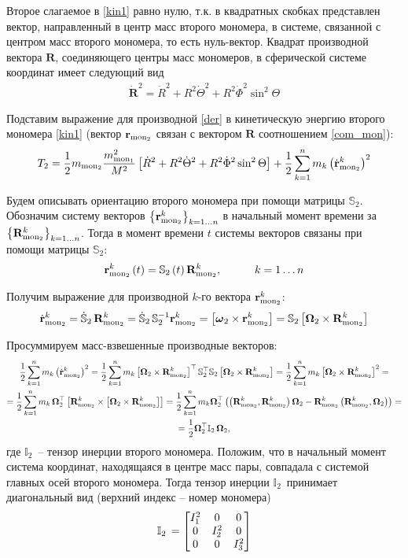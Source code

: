 \documentclass[14pt]{extarticle}
\newcommand{\vR}{\mathbf{R}}
\newcommand{\dvR}{\dot{\mathbf{R}}}
\newcommand{\mmf}{m_{\textup{mon}_1}}
\newcommand{\mms}{m_{\textup{mon}_2}}
\newcommand{\vrms}{\mathbf{r}_{\textup{mon}_2}}
\newcommand{\vRms}{\mathbf{R}_{\textup{mon}_2}}
\newcommand{\dvrms}{\dot{\mathbf{r}}_{\textup{mon}_2}}
\newcommand{\dR}{\dot{R}}
\newcommand{\dTheta}{\dot{\Theta}}
\newcommand{\dPhi}{\dot{\Phi}}
\newcommand{\omt}{\boldsymbol{\omega}_2}
\newcommand{\Omt}{\boldsymbol{\Omega}_2}
\newcommand{\bbSs}{\mathbb{S}_2}
\newcommand{\dbbSs}{\dot{\mathbb{S}}_2 \,}
\newcommand{\bbIt}{\mathbb{I}_2 \,}
\newcommand{\If}{I_1^2}
\newcommand{\Is}{I_2^2}
\newcommand{\It}{I_3^2}
\newcommand{\lb}{\left(}
\newcommand{\rb}{\right)}
\newcommand{\lsq}{\left[}
\newcommand{\rsq}{\right]}
\begin{document}
Второе слагаемое в \eqref{kin1} равно нулю, т.к. в квадратных скобках представлен вектор, направленный в центр масс второго мономера, в системе, связанной с центром масс второго мономера, то есть нуль-вектор. Квадрат производной вектора $\vR$, соединяющего центры масс мономеров, в сферической системе координат имеет следующий вид
\begin{gather}
	\dvR^2 = \dR^2 + R^2 \dTheta^2 + R^2 \dPhi^2 \sin^2 \Theta \label{der}
\end{gather}

Подставим выражение для производной \eqref{der} в кинетическую энергию второго мономера \eqref{kin1} (вектор $\vrms$ связан с вектором $\vR$ соотношением \eqref{com_mon}):
\begin{gather}
		T_2 = \frac{1}{2} \mms \frac{\mmf^2}{M^2} \left[ \dR^2 + R^2 \dTheta^2 + R^2 \dPhi^2 \sin^2 \Theta \right] + \frac{1}{2} \sum_{k=1}^n m_k \lb \dvrms^k \rb^2 
\end{gather}

Будем описывать ориентацию второго мономера при помощи матрицы $\bbSs$. Обозначим систему векторов $\left\{ \vrms^k \right\}_{k=1 \dots n}$ в начальный момент времени за $\left\{ \vRms^k \right\}_{k=1 \dots n}$. Тогда в момент времени $t$ системы векторов связаны при помощи матрицы $\bbSs$:
\begin{gather}
	\vrms^k \lb t \rb = \bbSs \lb t \rb \vRms^k, \quad \quad \quad k = 1 \dots n
\end{gather}

Получим выражение для производной $k$-го вектора $\vrms^k$:
\begin{gather}
	\dvrms^k = \dbbSs \vRms^k = \dbbSs \bbSs^{-1} \vrms^k = \lsq \omt \times \vrms^k \rsq = \bbSs \lsq \Omt \times \vRms^k \rsq \label{der2}
\end{gather}

Просуммируем масс-взвешенные производные векторов:
\begin{gather}
\frac{1}{2} \sum_{k=1}^n m_k \lb \dvrms^k \rb^2 = \frac{1}{2} \sum_{k=1}^n m_k \lsq \Omt \times \vRms^k \right]^\top \bbSs^\top \bbSs \lsq \Omt \times \vRms^k \rsq = \frac{1}{2} \sum_{k=1}^n m_k \lsq \Omt \times \vRms^k \rsq^2 = \notag \\
	= \frac{1}{2} \sum_{k=1}^n m_k \, \Omt^\top \lsq \vRms^k \times \lsq \Omt \times \vRms^k \rsq \rsq = \frac{1}{2} \sum_{k=1}^n m_k \Omt^\top \lb \lb \vRms^k, \vRms^k \rb \Omt - \vRms^k \lb \vRms^k, \Omt \rb \rb  = \notag \\ = \frac{1}{2} \Omt^\top \bbIt \Omt, \notag
\end{gather}
где $\bbIt$ -- тензор инерции второго мономера. Положим, что в начальный момент система координат, находящаяся в центре масс пары, совпадала с системой главных осей второго мономера. Тогда тензор инерции $\bbIt$ принимает диагональный вид (верхний индекс -- номер мономера)
\begin{gather}
	\bbIt = \begin{bmatrix}
		\If & 0 & 0 \\
		0 & \Is & 0 \\
		0 & 0 & \It
	\end{bmatrix} \notag
\end{gather}
\end{document}
